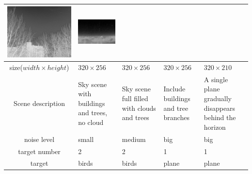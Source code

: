 \documentclass[journal]{IEEEtran}
\begin{document}
\begin{table}[t]
\begin{tabular}{|c|m{3cm}<{\centering}|m{3cm}<{\centering}|m{3cm}<{\centering}|m{3.2cm}<{\centering}|}
    \includegraphics[scale=0.26]{real-back3.png}&
    \includegraphics[scale=0.29]{real-back4.png}\\
    \hline
    size($width \times height$)& $320 \times 256$& $320 \times 256$& $320 \times 256$& $320\times 210$\\
    \hline
    Scene description& Sky scene with buildings and trees, no cloud & Sky scene full filled with clouds and trees & Include buildings and tree branches & A single plane gradually disappears behind the horizon\\
    \hline
    noise level & small & medium & big & big \\
    \hline
    target number & 2 & 2 & 1 & 1 \\
    \hline
    target & birds & birds & plane & plane \\
    \hline
  \end{tabular}
\end{table}
\end{document}
